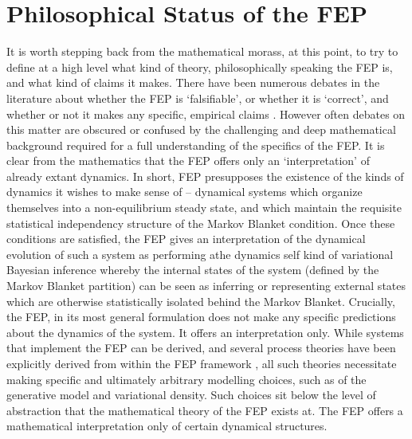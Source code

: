 \section{Philosophical Status of the FEP}
It is worth stepping back from the mathematical morass, at this point, to try to define at a high level what kind of theory, philosophically speaking the FEP is, and what kind of claims it makes. There have been numerous debates in the literature about whether the FEP is `falsifiable', or whether it is `correct', and whether or not it makes any specific, empirical claims \citep{williams2020brain,andrews2020math}. However often debates on this matter are obscured or confused by the challenging and deep mathematical background required for a full understanding of the specifics of the FEP. It is clear from the mathematics that the FEP offers only an `interpretation' of already extant dynamics. In short, FEP presupposes the existence of the kinds of dynamics it wishes to make sense of -- dynamical systems which organize themselves into a non-equilibrium steady state, and which maintain the requisite statistical independency structure of the Markov Blanket condition. Once these conditions are satisfied, the FEP gives an interpretation of the dynamical evolution of such a system as performing athe dynamics self  kind of variational Bayesian inference whereby the internal states of the system (defined by the Markov Blanket partition) can be seen as inferring or representing external states which are otherwise statistically isolated behind the Markov Blanket. Crucially, the FEP, in its most general formulation does not make any specific predictions about the dynamics of the system. It offers an interpretation only. While systems that implement the FEP can be derived, and several process theories have been explicitly derived from within the FEP framework \citep{friston2005theory,friston2015active}, all such theories necessitate making specific and ultimately arbitrary modelling choices, such as of the generative model and variational density. Such choices sit below the level of abstraction that the mathematical theory of the FEP exists at. The FEP offers a mathematical interpretation only of certain dynamical structures.

